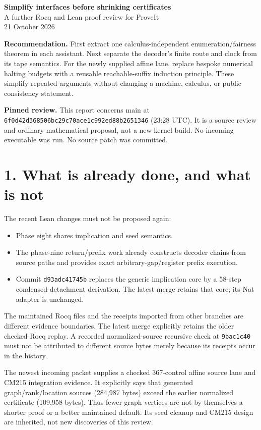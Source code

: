\documentclass[10pt]{article}
\newcommand{\code}[1]{\texttt{#1}}
\begin{document}
\begin{center}{\Large\bfseries Simplify interfaces before shrinking certificates}\\[6pt]
A further Rocq and Lean proof review for ProveIt\\21 October 2026\end{center}
\textbf{Recommendation.} First extract one calculus-independent enumeration/fairness theorem in each assistant. Next separate the decoder's finite route and clock from its tape semantics. For the newly supplied affine lane, replace bespoke numerical halting budgets with a reusable reachable-suffix induction principle. These simplify repeated arguments without changing a machine, calculus, or public consistency statement.

\textbf{Pinned review.} This report concerns main at
\code{6f0d42d368506bc29c70ace1c992ed88b2651346} (23:28 UTC).
It is a source review and ordinary mathematical proposal, not a new kernel build.
No incoming executable was run. No source patch was committed.

\section*{1. What is already done, and what is not}
The recent Lean changes must not be proposed again:
\begin{itemize}[leftmargin=*,nosep]
\item Phase eight shares implication and seed semantics.
\item The phase-nine return/prefix work already constructs decoder chains from source paths and provides exact arbitrary-gap/register prefix execution.
\item Commit \code{d93adc41745b} replaces the generic implication core by a 58-step condensed-detachment derivation. The latest merge retains that core; its Nat adapter is unchanged.
\end{itemize}
The maintained Rocq files and the receipts imported from other branches are different evidence boundaries. The latest merge explicitly retains the older checked Rocq replay. A recorded normalized-source recursive check at \code{9bac1c40} must not be attributed to different source bytes merely because its receipts occur in the history.

The newest incoming packet supplies a checked 367-control affine source lane and CM215 integration evidence. It explicitly says that generated graph/rank/location sources (284,987 bytes) exceed the earlier normalized certificate (109,958 bytes). Thus fewer graph vertices are not by themselves a shorter proof or a better maintained default. Its seed cleanup and CM215 design are inherited, not new discoveries of this review.
\end{document}
